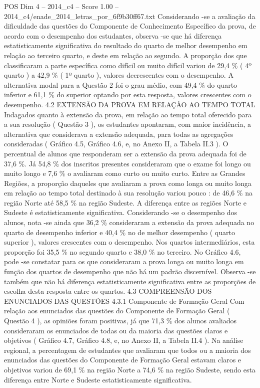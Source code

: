 \begin{textsample}{POS Dim 4 – 2014\_c4 – Score 1.00 – 2014\_c4/enade\_2014\_letras\_por\_6f9b30ff67.txt}
Considerando -se a avaliação da dificuldade das questões do Componente de Conhecimento Específico da prova, de acordo com o desempenho dos estudantes, observa -se que há diferença estatisticamente significativa do resultado do quarto de melhor desempenho em relação ao terceiro quarto, e deste em relação ao segundo.
A proporção dos que classificaram a parte específica como difícil ou muito difícil variou de 29,4 \% ( 4º quarto ) a 42,9 \% ( 1º quarto ), valores decrescentes com o desempenho.
A alternativa modal para a Questão 2 foi o grau médio, com 49,4 \% do quarto inferior e 61,1 \% do superior optando por esta resposta, valores crescentes com o desempenho. 4.2 EXTENSÃO DA PROVA EM RELAÇÃO AO TEMPO TOTAL Indagados quanto à extensão da prova, em relação ao tempo total oferecido para a sua resolução ( Questão 3 ), os estudantes apontaram, com maior incidência, a alternativa que considerava a extensão adequada, para todas as agregações consideradas ( Gráfico 4.5, Gráfico 4.6, e, no Anexo II, a Tabela II.3 ).
O percentual de alunos que responderam ser a extensão da prova adequada foi de 37,6 \%.
Já 54,8 \% dos inscritos presentes consideraram que o exame foi longo ou muito longo e 7,6 \% o avaliaram como curto ou muito curto.
Entre as Grandes Regiões, a proporção daqueles que avaliaram a prova como longa ou muito longa em relação ao tempo total destinado à sua resolução variou pouco : de 46,6 \% na região Norte até 58,5 \% na região Sudeste.
A diferença entre as regiões Norte e Sudeste é estatisticamente significativa.
Considerando -se o desempenho dos alunos, nota -se ainda que 36,2 \% consideraram a extensão da prova adequada no quarto de desempenho inferior e 40,4 \% no de melhor desempenho ( quarto superior ), valores crescentes com o desempenho.
Nos quartos intermediários, esta proporção foi 35,5 \% no segundo quarto e 38,0 \% no terceiro.
No Gráfico 4.6, pode -se constatar para os que consideraram a prova longa ou muito longa em função dos quartos de desempenho que não há um padrão discernível.
Observa -se também que não há diferença estatisticamente significativa entre as proporções de escolha desta resposta entre os quartos. 4.3 COMPREENSÃO DOS ENUNCIADOS DAS QUESTÕES 4.3.1 Componente de Formação Geral Com relação aos enunciados das questões do Componente de Formação Geral ( Questão 4 ), as opiniões foram positivas, já que 71,3 \% dos alunos avaliados consideraram os enunciados de todas ou da maioria das questões claros e objetivos ( Gráfico 4.7, Gráfico 4.8, e, no Anexo II, a Tabela II.4 ).
Na análise regional, a percentagem de estudantes que avaliaram que todos ou a maioria dos enunciados das questões do Componente de Formação Geral estavam claros e objetivos variou de 69,1 \% na região Norte a 74,6 \% na região Sudeste, sendo esta diferença entre Norte e Sudeste estatisticamente significativa.

\end{textsample}
